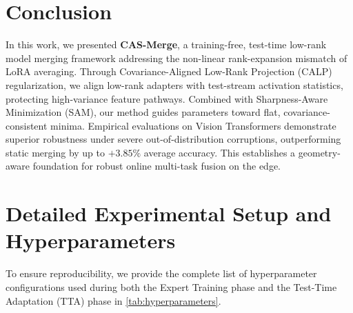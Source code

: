 \documentclass{article}
\begin{document}
\section{Conclusion}
\label{conclusion}
In this work, we presented \textbf{CAS-Merge}, a training-free, test-time low-rank model merging framework addressing the non-linear rank-expansion mismatch of LoRA averaging. Through Covariance-Aligned Low-Rank Projection (CALP) regularization, we align low-rank adapters with test-stream activation statistics, protecting high-variance feature pathways. Combined with Sharpness-Aware Minimization (SAM), our method guides parameters toward flat, covariance-consistent minima. Empirical evaluations on Vision Transformers demonstrate superior robustness under severe out-of-distribution corruptions, outperforming static merging by up to $+3.85\%$ average accuracy. This establishes a geometry-aware foundation for robust online multi-task fusion on the edge.

\clearpage




\clearpage
\appendix
\onecolumn

\section{Detailed Experimental Setup and Hyperparameters}
\label{app:experimental_setup}
To ensure reproducibility, we provide the complete list of hyperparameter configurations used during both the Expert Training phase and the Test-Time Adaptation (TTA) phase in \cref{tab:hyperparameters}.
\end{document}

